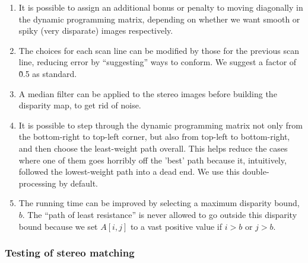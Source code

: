 \begin{enumerate}
\item It is possible to assign an additional bonus or penalty to moving
  diagonally in the dynamic programming matrix, depending on whether we want
  smooth or spiky (very disparate) images respectively.

\item The choices for each scan line can be modified by those for the previous
  scan line, reducing error by ``suggesting'' ways to conform. We suggest a factor
 of \~0.5 as standard.

\item A median filter can be applied to the stereo images before building the
  disparity map, to get rid of noise.

\item It is possible to step through the dynamic programming matrix not only from
  the bottom-right to top-left corner, but also from top-left to bottom-right,
  and then choose the least-weight path overall. This helps reduce the cases
  where one of them goes horribly off the 'best' path because it, intuitively,
  followed the lowest-weight path into a dead end. We use this double-processing
 by default.

\item The running time can be improved by selecting a maximum disparity bound,
  $b$. The ``path of least resistance'' is never allowed to go outside this
  disparity bound because we set $A[i,j]$ to a vast positive value if $i > b$ or
  $j > b$.
\end{enumerate}




\subsubsection{Testing of stereo matching}

